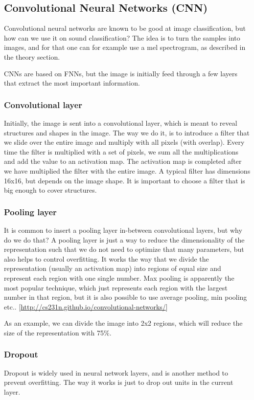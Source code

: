 \subsection{Convolutional Neural Networks (CNN)}
Convolutional neural networks are known to be good at image classification, but how can we use it on sound classification? The idea is to turn the samples into images, and for that one can for example use a mel spectrogram, as described in the theory section. 

CNNs are based on FNNs, but the image is initially feed through a few layers that extract the most important information. 

\subsubsection*{Convolutional layer}
Initially, the image is sent into a convolutional layer, which is meant to reveal structures and shapes in the image. The way we do it, is to introduce a filter that we slide over the entire image and multiply with all pixels (with overlap). Every time the filter is multiplied with a set of pixels, we sum all the multiplications and add the value to an activation map. The activation map is completed after we have multiplied the filter with the entire image. A typical filter has dimensions 16x16, but depends on the image shape. It is important to choose a filter that is big enough to cover structures. 

\subsubsection*{Pooling layer}
It is common to insert a pooling layer in-between convolutional layers, but why do we do that? A pooling layer is just a way to reduce the dimensionality of the representation such that we do not need to optimize that many parameters, but also helps to control overfitting. It works the way that we divide the representation (usually an activation map) into regions of equal size and represent each region with one single number. Max pooling is apparently the most popular technique, which just represents each region with the largest number in that region, but it is also possible to use average pooling, min pooling etc.. [\url{http://cs231n.github.io/convolutional-networks/}]

As an example, we can divide the image into 2x2 regions, which will reduce the size of the representation with 75\%. 

\subsubsection*{Dropout}
Dropout is widely used in neural network layers, and is another method to prevent overfitting. The way it works is just to drop out units in the current layer.

